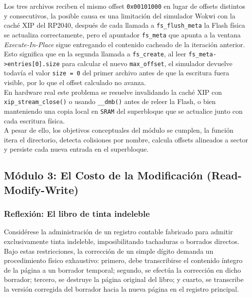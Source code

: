 \documentclass[12pt,letterpaper]{article}
\begin{document}
Los tres archivos reciben el mismo offset \texttt{0x00101000} en lugar de offsets distintos y consecutivos, la
posible causa es una limitación del simulador Wokwi con la caché XIP del RP2040, después de cada llamada a
\texttt{fs\_flush\_meta} la Flash física se actualiza correctamente, pero el apuntador \texttt{fs\_meta} que
apunta a la ventana \textit{Execute-In-Place} sigue entregando el contenido cacheado de la iteración anterior.\\
Esto significa que en la segunda llamada a \texttt{fs\_create}, al leer \texttt{fs\_meta->entries[0].size} para
calcular el nuevo \texttt{max\_offset}, el simulador devuelve todavía el valor \texttt{size = 0} del primer
archivo antes de que la escritura fuera visible, por lo que el offset calculado no avanza.\\

En hardware real este problema se resuelve invalidando la caché XIP con \texttt{xip\_stream\_close()} o usando
\texttt{\_\_dmb()} antes de releer la Flash, o bien manteniendo una copia local en \texttt{SRAM} del superbloque
que se actualice junto con cada escritura física.\\
A pesar de ello, los objetivos conceptuales del módulo se cumplen, la función itera el directorio, detecta
colisiones por nombre, calcula offsets alineados a sector y persiste cada nueva entrada en el superbloque.


\subsection*{Módulo 3: El Costo de la Modificación (Read-Modify-Write)}

\subsubsection*{Reflexión: El libro de tinta indeleble}
Considérese la administración de un registro contable fabricado para admitir exclusivamente tinta indeleble,
imposibilitando tachaduras o borrados directos. Bajo estas restricciones, la corrección de un simple dígito
demanda un procedimiento físico exhaustivo: primero, debe transcribirse el contenido íntegro de la página a un
borrador temporal; segundo, se efectúa la corrección en dicho borrador; tercero, se destruye la página original
del libro; y cuarto, se transcribe la versión corregida del borrador hacia la nueva página en el registro
principal.
\end{document}
